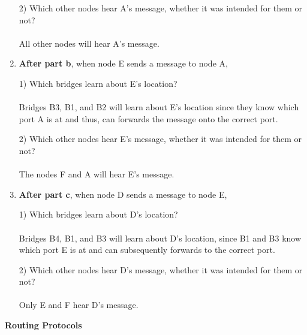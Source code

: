 \documentclass[10pt]{article}
\newenvironment{problem}[2][]{\begin{trivlist}
\item[\hskip \labelsep {\bfseries #1}\hskip \labelsep {\bfseries #2.}]}{\end{trivlist}}
\begin{document}
\begin{problem}{4: Bridges and Spanning Tree}
\begin{enumerate}[label=(\alph*)]
    2) Which other nodes hear A's message, whether it was intended for them or not? \\\\
    All other nodes will hear A's message.
    \item \textbf{After part b}, when node E sends a message to node A, 
    
    1) Which bridges learn about E's location? \\\\
    Bridges B3, B1, and B2 will learn about E's location since they know which port A is at and thus, can forwards the message onto the correct port.

    2) Which other nodes hear E's message, whether it was intended for them or not?\\\\
    The nodes F and A will hear E's message.
    \item \textbf{After part c}, when node D sends a message to node E, 
    
    1) Which bridges learn about D's location? \\\\
    Bridges B4, B1, and B3 will learn about D's location, since B1 and B3 know which port E is at and can subsequently forwards to the correct port.

    2) Which other nodes hear D's message, whether it was intended for them or not? \\\\
    Only E and F hear D's message.
\end{enumerate}
\end{problem}
\newpage
\textbf{Routing Protocols}
\end{document}
